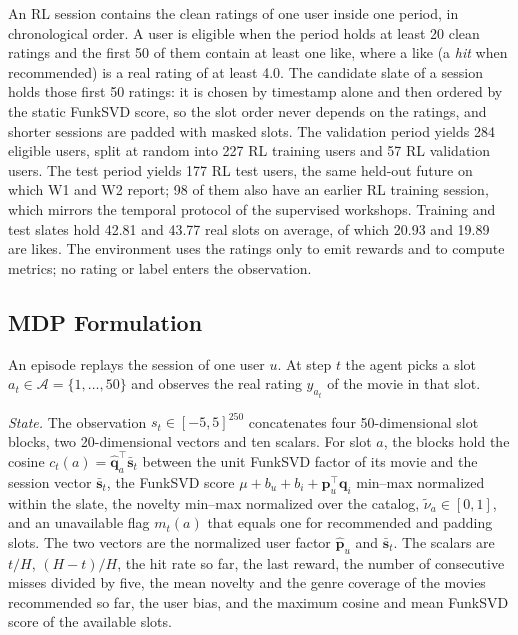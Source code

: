 An RL session contains the clean ratings of one user inside one period, in chronological order. A user is eligible when the period holds at least 20 clean ratings and the first 50 of them contain at least one like, where a like (a \emph{hit} when recommended) is a real rating of at least 4.0. The candidate slate of a session holds those first 50 ratings: it is chosen by timestamp alone and then ordered by the static FunkSVD score, so the slot order never depends on the ratings, and shorter sessions are padded with masked slots. The validation period yields 284 eligible users, split at random into 227 RL training users and 57 RL validation users. The test period yields 177 RL test users, the same held-out future on which W1 and W2 report; 98 of them also have an earlier RL training session, which mirrors the temporal protocol of the supervised workshops. Training and test slates hold 42.81 and 43.77 real slots on average, of which 20.93 and 19.89 are likes. The environment uses the ratings only to emit rewards and to compute metrics; no rating or label enters the observation.

\subsection{MDP Formulation}
\label{sec:mdp}

An episode replays the session of one user $u$. At step $t$ the agent picks a slot $a_t \in \mathcal{A} = \{1,\dots,50\}$ and observes the real rating $y_{a_t}$ of the movie in that slot.

\emph{State.} The observation $s_t \in [-5,5]^{250}$ concatenates four 50-dimensional slot blocks, two 20-dimensional vectors and ten scalars. For slot $a$, the blocks hold the cosine $c_t(a) = \hat{\mathbf{q}}_a^{\top}\bar{\mathbf{s}}_t$ between the unit FunkSVD factor of its movie and the session vector $\bar{\mathbf{s}}_t$, the FunkSVD score $\mu + b_u + b_i + \mathbf{p}_u^{\top}\mathbf{q}_i$ min--max normalized within the slate, the novelty min--max normalized over the catalog, $\tilde{\nu}_a \in [0,1]$, and an unavailable flag $m_t(a)$ that equals one for recommended and padding slots. The two vectors are the normalized user factor $\hat{\mathbf{p}}_u$ and $\bar{\mathbf{s}}_t$. The scalars are $t/H$, $(H-t)/H$, the hit rate so far, the last reward, the number of consecutive misses divided by five, the mean novelty and the genre coverage of the movies recommended so far, the user bias, and the maximum cosine and mean FunkSVD score of the available slots.

